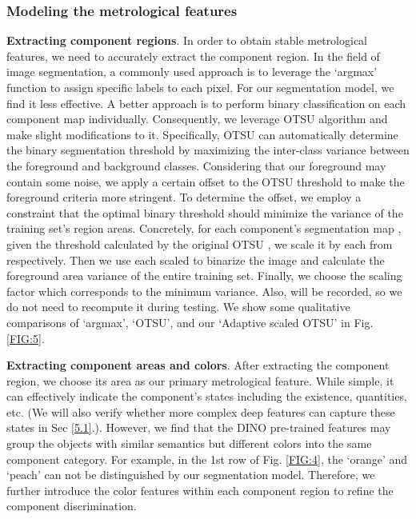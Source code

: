 \documentclass[final,5p,times,twocolumn]{elsarticle}
\begin{document}
\subsubsection{Modeling the metrological features}
\label{3.2.2}
\textbf{Extracting component regions}. In order to obtain stable metrological features, we need to accurately extract the component region. In the field of image segmentation, a commonly used approach is to leverage the `argmax' function to assign specific labels to each pixel. For our segmentation model, we find it less effective. A better approach is to perform binary classification on each component map individually. Consequently, we leverage OTSU algorithm and make slight modifications to it. Specifically, OTSU can automatically determine the binary segmentation threshold by maximizing the inter-class variance between the foreground and background classes. Considering that our foreground may contain some noise, we apply a certain offset to the OTSU threshold to make the foreground criteria more stringent. To determine the offset, we employ a constraint that the optimal binary threshold should minimize the variance of the training set's region areas. Concretely, for each component's segmentation map , given the threshold calculated by the original OTSU  , we scale it by each  from  respectively. Then we use each scaled  to binarize the image and calculate the foreground area variance of the entire training set. Finally, we choose the scaling factor  which corresponds to the minimum variance. Also,  will be recorded, so we do not need to recompute it during testing. We show some qualitative comparisons of `argmax', `OTSU', and our `Adaptive scaled OTSU' in Fig. \ref{FIG:5}.   

\textbf{Extracting component areas and colors}. After extracting the component region, we choose its area as our primary metrological feature. While simple, it can effectively indicate the component's states including the existence, quantities, etc. (We will also verify whether more complex deep features can capture these states in Sec \ref{5.1}.). However, we find that the DINO pre-trained features may group the objects with similar semantics but different colors into the same component category. For example, in the 1st row of Fig. \ref{FIG:4}, the `orange' and `peach' can not be distinguished by our segmentation model. Therefore, we further introduce the color features within each component region to refine the component discrimination.
\end{document}
